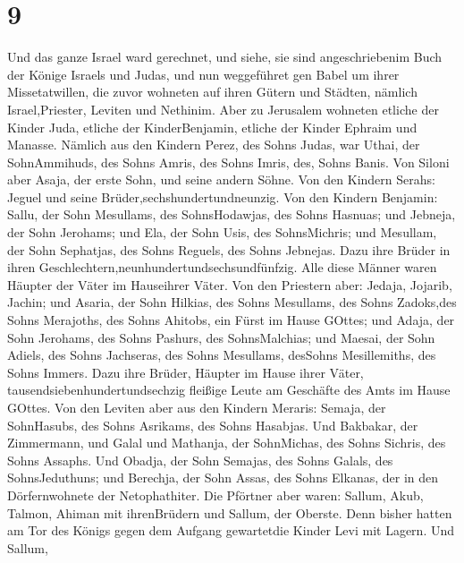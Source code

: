 \hypertarget{section-8}{%
\section{9}\label{section-8}}

 Und das ganze Israel ward gerechnet, und siehe, sie sind
angeschriebenim Buch der Könige Israels und Judas, und nun weggeführet
gen Babel um ihrer Missetatwillen,  die zuvor wohneten auf
ihren Gütern und Städten, nämlich Israel,Priester, Leviten und Nethinim.
 Aber zu Jerusalem wohneten etliche der Kinder Juda, etliche
der KinderBenjamin, etliche der Kinder Ephraim und Manasse. 
Nämlich aus den Kindern Perez, des Sohns Judas, war Uthai, der
SohnAmmihuds, des Sohns Amris, des Sohns Imris, des, Sohns Banis.
 Von Siloni aber Asaja, der erste Sohn, und seine andern
Söhne.  Von den Kindern Serahs: Jeguel und seine
Brüder,sechshundertundneunzig.  Von den Kindern Benjamin:
Sallu, der Sohn Mesullams, des SohnsHodawjas, des Sohns Hasnuas;
 und Jebneja, der Sohn Jerohams; und Ela, der Sohn Usis, des
SohnsMichris; und Mesullam, der Sohn Sephatjas, des Sohns Reguels, des
Sohns Jebnejas.  Dazu ihre Brüder in ihren
Geschlechtern,neunhundertundsechsundfünfzig. Alle diese Männer waren
Häupter der Väter im Hauseihrer Väter.  Von den Priestern
aber: Jedaja, Jojarib, Jachin;  und Asaria, der Sohn
Hilkias, des Sohns Mesullams, des Sohns Zadoks,des Sohns Merajoths, des
Sohns Ahitobs, ein Fürst im Hause GOttes;  und Adaja, der
Sohn Jerohams, des Sohns Pashurs, des SohnsMalchias; und Maesai, der
Sohn Adiels, des Sohns Jachseras, des Sohns Mesullams, desSohns
Mesillemiths, des Sohns Immers.  Dazu ihre Brüder, Häupter
im Hause ihrer Väter, tausendsiebenhundertundsechzig fleißige Leute am
Geschäfte des Amts im Hause GOttes.  Von den Leviten aber
aus den Kindern Meraris: Semaja, der SohnHasubs, des Sohns Asrikams, des
Sohns Hasabjas.  Und Bakbakar, der Zimmermann, und Galal
und Mathanja, der SohnMichas, des Sohns Sichris, des Sohns Assaphs.
 Und Obadja, der Sohn Semajas, des Sohns Galals, des
SohnsJeduthuns; und Berechja, der Sohn Assas, des Sohns Elkanas, der in
den Dörfernwohnete der Netophathiter.  Die Pförtner aber
waren: Sallum, Akub, Talmon, Ahiman mit ihrenBrüdern und Sallum, der
Oberste.  Denn bisher hatten am Tor des Königs gegen dem
Aufgang gewartetdie Kinder Levi mit Lagern.  Und Sallum,
